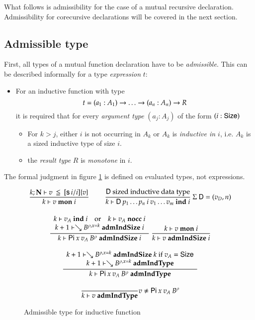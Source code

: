 \newcommand{\mon}[3]{#1\vdash#2\mbox{ \textbf{mon} }#3}
\newcommand{\indu}[3]{#1\vdash#2\mbox{ \textbf{ind} }#3}
\newcommand{\coind}[3]{#1\vdash#2\mbox{ \textbf{coind} }#3}
\newcommand{\admIndSize}[3]{#1\vdash#2\mbox{ \textbf{admIndSize} }#3}
\newcommand{\admCoSize}[3]{#1\vdash#2\mbox{ \textbf{admCoSize} }#3}
\newcommand{\admIndType}[2]{#1\vdash#2\mbox{ \textbf{admIndType}}}
\newcommand{\admCoType}[2]{#1\vdash#2\mbox{ \textbf{admCoType}}}

\newcommand{\sizePat}[1]{\vdash#1\mbox{ \textbf{sizePat}}}
\newcommand{\sizePats}[1]{\vdash#1\mbox{ \textbf{sizePats}}}

What follows is admissibility for the case of a mutual recursive declaration.
Admissibility for corecursive declarations will be covered in the next section.
\subsection{Admissible type}

First, all types of a mutual function declaration have to be \emph{admissible}.
This can be described informally for a type \emph{expression} $t$:
\begin{itemize}
\item
For an inductive function with type \[t = (a_1 : A_1) \rightarrow \ldots \rightarrow (a_n : A_n) \rightarrow R\]
it is required that for every \emph{argument type} $(a_j : A_j)$ of the form $(i : \mathsf{Size})$  
\begin{itemize}
\item
For $k>j$, either $i$ is not occurring in $A_k$ or $A_k$ is \emph{inductive in $i$}, i.e. $A_k$ is a sized inductive type of size $i$.
\item
the \emph{result type} $R$ is \emph{monotone} in $i$. 
\end{itemize}
\end{itemize}
The formal judgment in figure \ref{admi} is defined on evaluated types, not expressions.

\begin{figure}[htp]
\begin{gather*}
\nru{}
{\LeqVal{k}{\nF}{v}{\subst{[\s i/i]}{v}}}
{\mon{k}{v}{i}}
\qquad
\nru{}
{\DD \mbox{ sized inductive data type}}
{\indu{k}{\DD \: p_1 \ldots p_n \: i \: v_1 \ldots v_m}{i}}
{\: \Sig \: \DD = (v_D,n)}
\\[2ex]
\ndru{}
{\indu{k}{v_A}{i} \quad \mbox{or} \quad \nocc{k}{v_A}{i}}
{\admIndSize{k+1}{\wh \cl{B}{\ins{\rho}{x}{k}}}{i}}
{\admIndSize{k}{\vpi \: x \: v_A \: \cl{B}{\rho}}{i}}
\nru{}
{\mon{k}{v}{i}}
{\admIndSize{k}{v}{i}}
\\[2ex]
\ndru{}
{\admIndSize{k+1}{\wh \cl{B}{\ins{\rho}{x}{k}}}{k} \mbox{ if } v_A = \Size}
{\admIndType{k+1}{\wh \cl{B}{\ins{\rho}{x}{k}}}}
{\admIndType{k}{\vpi \: x \: v_A \: \cl{B}{\rho}}}
\\[2ex]
\nru{}
{}
{\admIndType{k}{v}}
v \neq \vpi \: x \: v_A \: \cl{B}{\rho}
\end{gather*}
\caption{Admissible type for inductive function}
\label{admi}
\end{figure}

